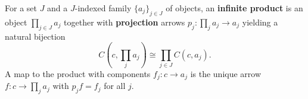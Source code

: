 For a set $J$ and a $J$-indexed family $\{a_j\}_{j \in J}$ of objects, an \textbf{infinite product} is an object $\prod_{j \in J} a_j$ together with \textbf{projection} arrows $p_j: \prod_j a_j \to a_j$ yielding a natural bijection
$$C(c, \prod_j a_j) \cong \prod_{j \in J} C(c, a_j).$$
A map to the product with components $f_j: c \to a_j$ is the unique arrow $f: c \to \prod_j a_j$ with $p_j f = f_j$ for all $j$.